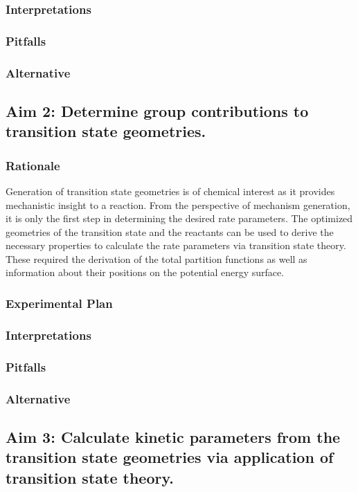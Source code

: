 \documentclass[12pt]{article}
\begin{document}
\subsubsection{Interpretations}



\subsubsection{Pitfalls}
\subsubsection{Alternative}

\subsection{Aim 2: Determine group contributions to transition state geometries.}
\subsubsection{Rationale}

Generation of transition state geometries is of chemical interest as it provides mechanistic insight to a reaction. From the perspective of mechanism generation, it is only the first step in determining the desired rate parameters. The optimized geometries of the transition state and the reactants can be used to derive the necessary properties to calculate the rate parameters via transition state theory. These required the derivation of the total partition functions as well as information about their positions on the potential energy surface.

\subsubsection{Experimental Plan}
\subsubsection{Interpretations}
\subsubsection{Pitfalls}
\subsubsection{Alternative}

\subsection{Aim 3: Calculate kinetic parameters from the transition state geometries via application of transition state theory.}
\end{document}
